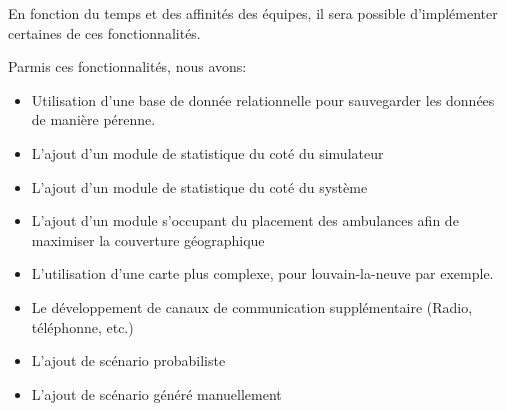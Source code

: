 En fonction du temps et des affinités des équipes, il sera possible d'implémenter
certaines de ces fonctionnalités.

Parmis ces fonctionnalités, nous avons:
\begin{itemize}
	\item Utilisation d'une base de donnée relationnelle pour sauvegarder les 
		  données de manière pérenne.
	\item L'ajout d'un module de statistique du coté du simulateur
	\item L'ajout d'un module de statistique du coté du système
	\item L'ajout d'un module s'occupant du placement des ambulances
		  afin de maximiser la couverture géographique
	\item L'utilisation d'une carte plus complexe, pour louvain-la-neuve par
		  exemple.
	\item Le développement de canaux de communication supplémentaire (Radio, 
	      téléphonne, etc.)
	\item L'ajout de scénario probabiliste
	\item L'ajout de scénario généré manuellement
\end{itemize}
